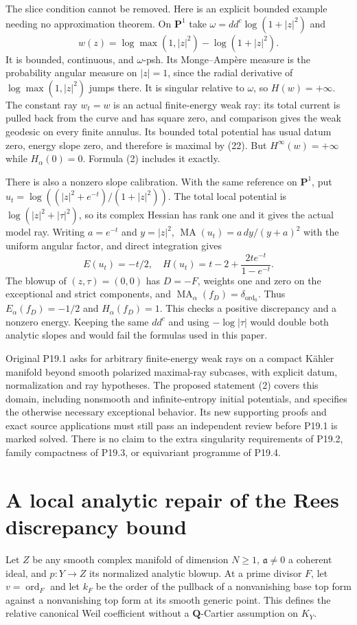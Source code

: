 \documentclass[11pt]{article}
\newcommand{\MA}{\operatorname{MA}}
\newcommand{\ord}{\operatorname{ord}}
\begin{document}
The slice condition cannot be removed. Here is an explicit bounded
example needing no approximation theorem. On $\mathbf P^1$ take
$\omega=dd^c\log(1+|z|^2)$ and
\[
 w(z)=\log\max(1,|z|^2)-\log(1+|z|^2).
\]
It is bounded, continuous, and $\omega$-psh. Its Monge--Amp\`ere
measure is the probability angular measure on $|z|=1$, since the
radial derivative of $\log\max(1,|z|^2)$ jumps there. It is
singular relative to $\omega$, so $H(w)=+\infty$. The constant
ray $w_t=w$ is an actual finite-energy weak ray: its total current
is pulled back from the curve and has square zero, and comparison
gives the weak geodesic on every finite annulus. Its bounded total
potential has usual datum zero, energy slope zero, and therefore is
maximal by (22). But $H^\infty(w)=+\infty$ while
$H_\alpha(0)=0$. Formula (2) includes it exactly.

There is also a nonzero slope calibration. With the same reference
on $\mathbf P^1$, put
$u_t=\log((|z|^2+e^{-t})/(1+|z|^2))$.
The total local potential is $\log(|z|^2+|\tau|^2)$, so its
complex Hessian has rank one and it gives the actual model ray.
Writing $a=e^{-t}$ and $y=|z|^2$,
$\MA(u_t)=a\,dy/(y+a)^2$ with the uniform angular factor, and
direct integration gives
\[
 E(u_t)=-t/2,\quad
 H(u_t)=t-2+\frac{2te^{-t}}{1-e^{-t}}.
\]
The blowup of $(z,\tau)=(0,0)$ has $D=-F$, weights one and zero
on the exceptional and strict components, and
$\MA_\alpha(f_D)=\delta_{\ord_0}$.
Thus $E_\alpha(f_D)=-1/2$ and $H_\alpha(f_D)=1$.
This checks a positive discrepancy and a nonzero energy. Keeping
the same $dd^c$ and using $-\log|\tau|$ would double both analytic
slopes and would fail the formulas used in this paper.

Original P19.1 asks for arbitrary finite-energy weak rays on a compact
K\"ahler manifold beyond smooth polarized maximal-ray subcases,
with explicit datum, normalization and ray hypotheses. The proposed
statement (2) covers this domain, including nonsmooth and
infinite-entropy initial potentials, and specifies the otherwise
necessary exceptional behavior. Its new supporting proofs and exact
source applications must still pass an independent review before
P19.1 is marked solved. There is no claim to the extra singularity
requirements of P19.2, family compactness of P19.3, or equivariant
programme of P19.4.

\appendix
\section{A local analytic repair of the Rees discrepancy bound}
Let $Z$ be any smooth complex manifold of dimension $N\geq1$,
$\mathfrak a\ne0$ a coherent ideal, and $p:Y\to Z$ its normalized
analytic blowup. At a prime divisor $F$, let $v=\ord_F$ and let
$k_F$ be the order of the pullback of a nonvanishing base top form
against a nonvanishing top form at its smooth generic point.
This defines the relative canonical Weil coefficient without a
$\mathbf Q$-Cartier assumption on $K_Y$.
\end{document}
